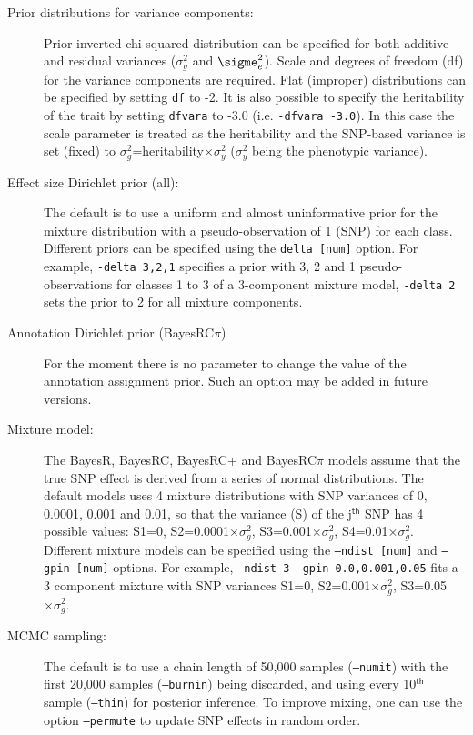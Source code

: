 \documentclass{ol-softwaremanual}
\begin{document}
\begin{description}
\item[Prior distributions for variance components:] Prior inverted-chi squared distribution can be specified for both additive and residual variances ($\sigma_g^2$ and $\sigme_e^2$). Scale and degrees of freedom (df) for the variance components are required. Flat (improper) distributions can be specified by setting \texttt{df} to -2. It is also possible to specify the heritability of the trait by setting \texttt{dfvara} to -3.0 (i.e. \texttt{-dfvara -3.0}). In this case the scale parameter is treated as the heritability and the SNP-based variance is set (fixed) to $\sigma_g^2$=heritability$\times \sigma_y^2$ ($\sigma_y^2$ being the phenotypic variance).
\item[Effect size Dirichlet prior (all):] The default is to use a uniform and almost uninformative prior for the mixture distribution with a pseudo-observation of 1 (SNP) for each class. Different priors can be specified using the \texttt{delta [num]} option. For example, \texttt{-delta 3,2,1} specifies a prior with 3, 2 and 1 pseudo-observations for classes 1 to 3 of a 3-component mixture model, \texttt{-delta 2} sets the prior to 2 for all mixture components.
\item[Annotation Dirichlet prior (BayesRC$\pi$)] For the moment there is no parameter to change the value of the annotation assignment prior. Such an option may be added in future versions.
\item[Mixture model:] The BayesR, BayesRC, BayesRC+ and BayesRC$\pi$ models assume that the true SNP effect is derived from a series of normal distributions. The default models uses 4 mixture distributions with SNP variances of 0, 0.0001, 0.001 and 0.01, so that the variance (S) of the j$^{\mathsf{th}}$ SNP has 4 possible values:  S1=0, S2=0.0001$\times \sigma_g^2$, S3=0.001$\times \sigma_g^2$, S4=0.01$\times \sigma_g^2$. Different mixture models can be specified using 
the \texttt{–ndist [num]} and \texttt{–gpin [num]} options. For example, \texttt{–ndist 3 –gpin 0.0,0.001,0.05} fits a 3 component mixture with SNP variances S1=0, S2=0.001$\times \sigma_g^2$, S3=0.05$\times \sigma_g^2$. 
\item[MCMC sampling:] The default is to use a chain length of 50,000 samples (\texttt{–numit}) with the first 20,000 samples (\texttt{–burnin}) being discarded, and using every 10$^{\mathsf{th}}$ sample (\texttt{–thin}) for posterior inference. To improve mixing, one can use the option \texttt{–permute} to update SNP effects in random order. 
\end{description}
\end{document}
